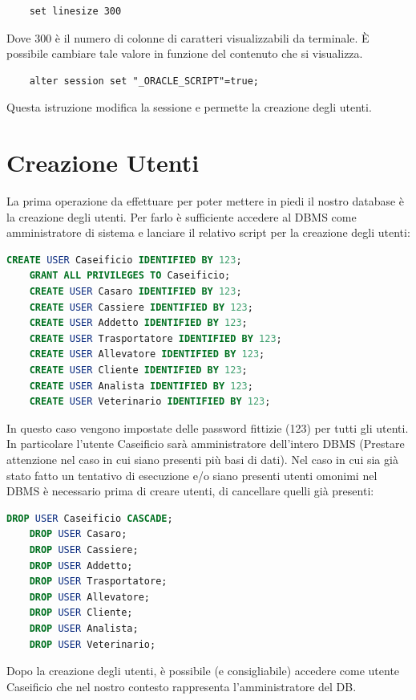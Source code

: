 \documentclass[12pt]{report}
\begin{document}
\begin{lstlisting}
	set linesize 300
\end{lstlisting}
Dove 300 è il numero di colonne di caratteri visualizzabili da terminale. È possibile cambiare tale valore in funzione del contenuto che si visualizza.
\begin{lstlisting}
    alter session set "_ORACLE_SCRIPT"=true;  
\end{lstlisting}
Questa istruzione modifica la sessione e permette la creazione degli utenti.


\section{Creazione Utenti}
La prima operazione da effettuare per poter mettere in piedi il nostro database è la creazione degli utenti. Per farlo è sufficiente accedere al DBMS come amministratore di sistema e lanciare il relativo script per la creazione degli utenti:

\begin{lstlisting}[language=SQL,caption={CREA\_UTENTI}]
	CREATE USER Caseificio IDENTIFIED BY 123;
	GRANT ALL PRIVILEGES TO Caseificio;
	CREATE USER Casaro IDENTIFIED BY 123;
	CREATE USER Cassiere IDENTIFIED BY 123;
	CREATE USER Addetto IDENTIFIED BY 123;
	CREATE USER Trasportatore IDENTIFIED BY 123;
	CREATE USER Allevatore IDENTIFIED BY 123;
	CREATE USER Cliente IDENTIFIED BY 123;
	CREATE USER Analista IDENTIFIED BY 123;
	CREATE USER Veterinario IDENTIFIED BY 123;
\end{lstlisting}
In questo caso vengono impostate delle password fittizie (123) per tutti gli utenti. In particolare l'utente Caseificio sarà amministratore dell'intero DBMS (Prestare attenzione nel caso in cui siano presenti più basi di dati). Nel caso in cui sia già stato fatto un tentativo di esecuzione e/o siano presenti utenti omonimi nel DBMS è necessario prima di creare utenti, di cancellare quelli già presenti:
\begin{lstlisting}[language=SQL,caption={DROP\_UTENTI}]
	DROP USER Caseificio CASCADE;
	DROP USER Casaro;
	DROP USER Cassiere;
	DROP USER Addetto;
	DROP USER Trasportatore;
	DROP USER Allevatore;
	DROP USER Cliente;
	DROP USER Analista;
	DROP USER Veterinario;
\end{lstlisting}
Dopo la creazione degli utenti, è possibile (e consigliabile) accedere come utente Caseificio che nel nostro contesto rappresenta l'amministratore del DB.
\end{document}
